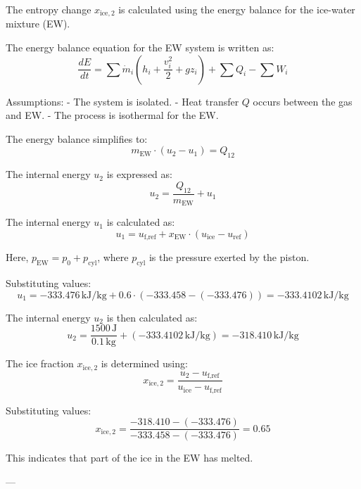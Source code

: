 The entropy change \( x_{\text{ice},2} \) is calculated using the energy balance for the ice-water mixture (EW).  

The energy balance equation for the EW system is written as:  
\[
\frac{dE}{dt} = \sum \dot{m}_i \left( h_i + \frac{v_i^2}{2} + g z_i \right) + \sum Q_i - \sum W_i
\]  

Assumptions:  
- The system is isolated.  
- Heat transfer \( Q \) occurs between the gas and EW.  
- The process is isothermal for the EW.  

The energy balance simplifies to:  
\[
m_{\text{EW}} \cdot (u_2 - u_1) = Q_{12}
\]  

The internal energy \( u_2 \) is expressed as:  
\[
u_2 = \frac{Q_{12}}{m_{\text{EW}}} + u_1
\]  

The internal energy \( u_1 \) is calculated as:  
\[
u_1 = u_{\text{f,ref}} + x_{\text{EW}} \cdot (u_{\text{ice}} - u_{\text{ref}})
\]  

Here, \( p_{\text{EW}} = p_0 + p_{\text{cyl}} \), where \( p_{\text{cyl}} \) is the pressure exerted by the piston.  

Substituting values:  
\[
u_1 = -333.476 \, \text{kJ/kg} + 0.6 \cdot (-333.458 - (-333.476)) = -333.4102 \, \text{kJ/kg}
\]  

The internal energy \( u_2 \) is then calculated as:  
\[
u_2 = \frac{1500 \, \text{J}}{0.1 \, \text{kg}} + (-333.4102 \, \text{kJ/kg}) = -318.410 \, \text{kJ/kg}
\]  

The ice fraction \( x_{\text{ice},2} \) is determined using:  
\[
x_{\text{ice},2} = \frac{u_2 - u_{\text{f,ref}}}{u_{\text{ice}} - u_{\text{f,ref}}}
\]  

Substituting values:  
\[
x_{\text{ice},2} = \frac{-318.410 - (-333.476)}{-333.458 - (-333.476)} = 0.65
\]  

This indicates that part of the ice in the EW has melted.  

---